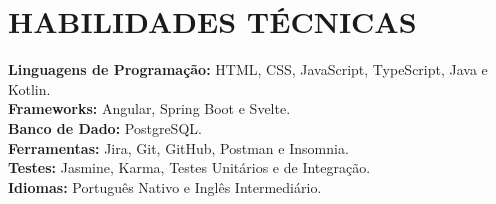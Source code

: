 
          

\section{HABILIDADES TÉCNICAS}
\begin{itemize}[leftmargin=0in, label={}]
	\small{\item{
		\textbf{Linguagens de Programação:}
		{HTML, CSS, JavaScript, TypeScript, Java e Kotlin.}
		\vspace{2pt} \\
				
		\textbf{Frameworks:}
		{Angular, Spring Boot e Svelte.}
		\vspace{2pt} \\
						     
		\textbf{Banco de Dado:}
		{PostgreSQL.}
		\vspace{2pt} \\

		\textbf{Ferramentas:}
		{Jira, Git, GitHub, Postman e Insomnia.}
		\vspace{2pt} \\

		\textbf{Testes:}
		{Jasmine, Karma, Testes Unitários e de Integração.}
		\vspace{2pt} \\
						     
		\textbf{Idiomas:}
		{Português Nativo e Inglês Intermediário.}
	}}
\end{itemize}